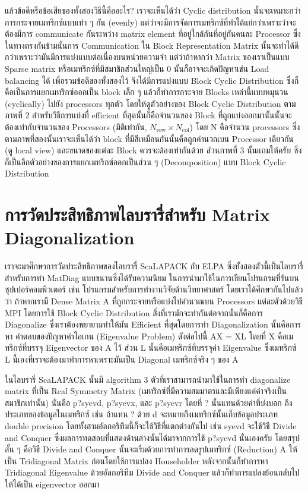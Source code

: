 แล้วข้อดีหรือข้อเสียของทั้งสองวิธีนี้คืออะไร? เราจะเห็นได้ว่า Cyclic distribution นั้นจะเหมาะกว่าการกระจายเมทริกซ์แบบเท่า ๆ กัน (evenly) 
แต่ว่าจะมีการจัดการเมทริกซ์ที่ทำได้แย่กว่าเพราะว่าจะต้องมีการ communicate กันระหว่าง matrix element ที่อยู่ใกล้กันที่อยู่กันคนละ Processor 
ซึ่งในทางตรงกันข้ามนั้นการ Communication ใน Block Representation Matrix นั้นจะทำได้ดีกว่าเพราะว่ามันมีการแบ่งแบบต่อเนื่องบนหน่วยความจำ 
แต่ว่าถ้าหากว่า Matrix ของเราเป็นแบบ Sparse matrix หรือเมทริกซ์ที่มีสมาชิกส่วนใหญ่เป็น 0 นั้นก็อาจจะเกิดปัญหาเช่น Load balancing ได้
เพื่อรวมข้อดีของทั้งสองไว้ จึงได้มีการแบ่งแบบ Block Cyclic Distribution ซึ่งก็คือเป็นการแยกเมทริกซ์ออกเป็น block เล็ก ๆ แล้วก็ทำการกระจาย 
Blocks เหล่านี้แบบหมุนวน (cyclically) ไปยัง processors ทุกตัว โดยให้ดูตัวอย่างของ Block Cyclic Distribution ตามภาพที่ 2
สำหรับวิธีการแบ่งที่ efficient ที่สุดนั้นก็คือจำนวนของ Block ที่ถูกแบ่งออกมานั้นนั้นจะต้องเท่ากับจำนวนของ Processors 
(มิติเท่ากัน, $N_{\text{row}} \times N_{\text{col}}$) 
โดย N คือจำนวน processors ซึ่งตามภาพที่สองนั้นเราจะเห็นได้ว่า block ที่มีสีเหมือนกันนั้นคือถูกคำนวณบน Processor เดียวกัน (ดู local view) 
และขนาดของแต่ละ Block ควรจะต้องเท่ากันด้วย ส่วนภาพที่ 3 นั้นแถมให้ครับ ซึ่งก็เป็นอีกตัวอย่างของการแยกเมทริกซ์ออกเป็นส่วน ๆ (Decomposition) 
แบบ Block Cyclic Distribution

\section{การวัดประสิทธิภาพไลบรารี่สำหรับ Matrix Diagonalization}

เราจะมาศึกษาการวัดประสิทธิภาพของไลบรารี่ ScaLAPACK กับ ELPA ซึ่งทั้งสองตัวนี้เป็นไลบรารี่สำหรับการทำ MatDiag แบบขนานซึ่งได้รับความนิยม%
ในการนำมาใช้ในการเขียนโปรแกรมที่รันบนซุปเปอร์คอมพิวเตอร์ เช่น โปรแกรมสำหรับการทำงานวิจัยด้านวิทยาศาสตร์ โดยเราได้ศึกษากันไปแล้วว่า%
ถ้าหากเรามี Dense Matrix A ที่ถูกกระจายหรือแบ่งไปคำนวณบน Processors แต่ละตัวด้วยวิธี MPI โดยการใช้ Block Cyclic Distribution 
สิ่งที่เรามักจะทำกันต่อจากนั้นก็คือการ Diagonalize ซึ่งเราต้องพยายามทำให้มัน Efficient ที่สุดโดยการทำ Diagonalization นั้นคือการหา%
คำตอบของปัญหาค่าไอเกน (Eigenvalue Problem) ดังต่อไปนี้ AX = XL โดยที่ X คือเมทริกซ์ที่บรรจุ Eigenvector ของ A ไว้ ส่วน L 
นั้นคือเมทริกซ์ที่บรรจุค่า Eigenvalue ซึ่งเมทริกซ์ L นี้เองที่เราจะต้องมาทำการหาเพราะมันเป็น Diagonal เมทริกซ์จริง ๆ ของ A 

ในไลบรารี่ ScaLAPACK นั้นมี algorithm 3 ตัวที่เราสามารถนำมาใช้ในการทำ diagonalize matrix ที่เป็น Real Symmetry Matrix 
(เมทริกซ์ที่มีความสมมาตรและมีเพียงแค่ค่าจริงเป็นสมาชิกเท่านั้น) นั่นคือ p?syevd, p?syevx, และ p?syevr โดยที่ ? นั้นแทนด้วยค่าที่บ่งบอก%
ถึงประเภทของข้อมูลในเมทริกซ์ เช่น ถ้าแทน ? ด้วย d จะหมายถึงเมทริกซ์นั้นเก็บข้อมูลประเภท double precision
โดยทั้งสามอัลกอริทึมนี้ก็จะใช้วิธีที่แตกต่างกันไป เช่น syevd จะใช้วิธี Divide and Conquer ซึ่งผลการทดสอบที่แสดงด้านล่างนั้นได้มาจากการใช้ 
p?syevd นั่นเองครับ โดยสรุปสั้น ๆ คือวิธี Divide and Conquer นั้นจะเริ่มด้วยการทำการลดรูปเมทริกซ์ (Reduction) A ให้เป็น Tridiagonal 
Matrix ก่อนโดยใช้การแปลง Householder หลังจากนั้นก็ทำการหา Tridiagonal Eigenvalue ด้วยอัลกอริทึม Divide and Conquer 
แล้วก็ทำการแปลงย้อนกลับไปให้ได้เป็น eigenvector ออกมา

